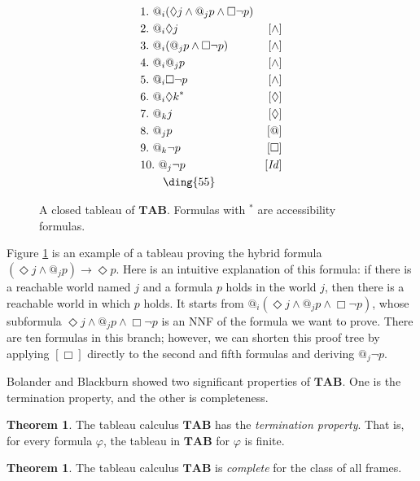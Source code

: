 \documentclass{article}
\theoremstyle{definition}
\newtheorem{theorem}[definition]{Theorem}
\newcommand{\Dia}{\Diamond}
\newcommand{\tableau}{\mathbf{TAB}}
\newcommand{\Id}{\mathit{Id}}
\begin{document}
\begin{figure}[t]
  \begin{align*}
    &1. \ @_i (\Dia j \land @_j p \land \Box \neg p) & \\
    &2. \ @_i \Dia j &[\land] \\
    &3. \ @_i (@_j p \land \Box \neg p) &[\land] \\
    &4. \ @_i @_j p &[\land] \\
    &5. \ @_i \Box \neg p &[\land] \\
    &6. \ {@_i \Dia k}^* &[\Dia] \\
    &7. \ @_k j &[\Dia] \\
    &8. \ @_j p &[@] \\
    &9. \ @_k \neg p &[\Box] \\
    &10. \ @_j \neg p &[\Id] \\ 
    &\qquad \text{\ding{55}}
  \end{align*}
  \centering
  \caption{A closed tableau of $\tableau$. Formulas with ${}^*$ are accessibility formulas.}
  \label{figtab}
\end{figure}

Figure \ref{figtab} is an example of a tableau proving the hybrid formula $(\Dia j \land @_j p) \rightarrow \Dia p$. Here is an intuitive explanation of this formula: if there is a reachable world named $j$ and a formula $p$ holds in the world $j$, then there is a reachable world in which $p$ holds. It starts from $@_i (\Dia j \land @_j p \land \Box \neg p)$, whose subformula $\Dia j \land @_j p \land \Box \neg p$ is an NNF of the formula we want to prove. There are ten formulas in this branch; however, we can shorten this proof tree by applying $[\Box]$ directly to the second and fifth formulas and deriving $@_j \neg p$.

Bolander and Blackburn \cite{bolander2007} showed two significant properties of $\tableau$. One is the termination property, and the other is completeness.

\begin{theorem}
  The tableau calculus $\tableau$ has the \emph{termination property}. That is, for every formula $\varphi$, the tableau in $\tableau$ for $\varphi$ is finite.
  \label{thmterm}
\end{theorem}

\begin{theorem}
  The tableau calculus $\tableau$ is \emph{complete} for the class of all frames.
  \label{thmcomplete}
\end{theorem}
\end{document}
